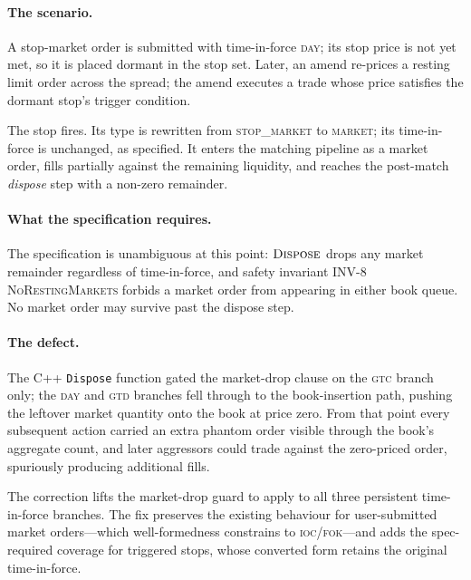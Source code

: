 \documentclass[11pt,a4paper]{article}
\begin{document}
\paragraph{The scenario.} A stop-market order is submitted with
time-in-force \textsc{day}; its stop price is not yet met, so it
is placed dormant in the stop set. Later, an amend re-prices a
resting limit order across the spread; the amend executes a trade
whose price satisfies the dormant stop's trigger condition.

The stop fires. Its type is rewritten from \textsc{stop\_market}
to \textsc{market}; its time-in-force is unchanged, as specified.
It enters the matching pipeline as a market order, fills partially
against the remaining liquidity, and reaches the post-match
\emph{dispose} step with a non-zero remainder.

\paragraph{What the specification requires.} The specification is
unambiguous at this point: $\textsc{Dispose}$ drops any market
remainder regardless of time-in-force, and safety invariant INV-8
\textsc{NoRestingMarkets} forbids a market order from appearing
in either book queue. No market order may survive past the
dispose step.

\paragraph{The defect.} The C++ \texttt{Dispose} function gated
the market-drop clause on the \textsc{gtc} branch only; the
\textsc{day} and \textsc{gtd} branches fell through to the
book-insertion path, pushing the leftover market quantity onto
the book at price zero. From that point every subsequent action
carried an extra phantom order visible through the book's
aggregate count, and later aggressors could trade against the
zero-priced order, spuriously producing additional fills.

The correction lifts the market-drop guard to apply to all three
persistent time-in-force branches. The fix preserves the existing
behaviour for user-submitted market orders---which well-formedness
constrains to \textsc{ioc}/\textsc{fok}---and adds the
spec-required coverage for triggered stops, whose converted form
retains the original time-in-force.
\end{document}
